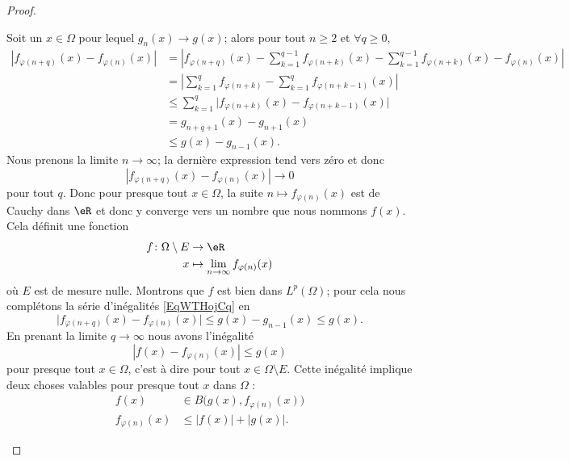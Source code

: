 \begin{proof}
\begin{subproof}
        Soit un \( x\in \Omega\) pour lequel \( g_n(x)\to g(x)\); alors pour tout \( n\geq 2\) et \( \forall q\geq 0\),
        \begin{subequations}    \label{EqWTHojCq}
            \begin{align}
                | f_{\varphi(n+q)}(x)-f_{\varphi(n)}(x) |&=\left| f_{\varphi(n+q)}(x)-\sum_{k=1}^{q-1}f_{\varphi(n+k)}(x) -\sum_{k=1}^{q-1}f_{\varphi(n+k)}(x)-f_{\varphi(n)}(x) \right| \\
                &=\left| \sum_{k=1}^qf_{\varphi(n+k)}-\sum_{k=1}^qf_{\varphi(n+k-1)}(x) \right|\\
                &\leq \sum_{k=1}^q\Big| f_{\varphi(n+k)}(x)-f_{\varphi(n+k-1)}(x) \Big|\\
                &=g_{n+q+1}(x)-g_{n+1}(x)\\
                &\leq g(x)-g_{n-1}(x).
            \end{align}
        \end{subequations}
        Nous prenons la limite \( n\to \infty\); la dernière expression tend vers zéro et donc
        \begin{equation}
            | f_{\varphi(n+q)}(x)-f_{\varphi(n)}(x) |\to 0
        \end{equation}
        pour tout \( q\). Donc pour presque tout \( x\in \Omega\), la suite \( n\mapsto f_{\varphi(n)}(x)\) est de Cauchy dans \( \eR\) et donc y converge vers un nombre que nous nommons \( f(x)\). Cela définit une fonction
        \begin{equation}
            \begin{aligned}
                f\colon \Omega\setminus E&\to \eR \\
                x&\mapsto \lim_{n\to \infty} f_{\varphi(n)}(x)
            \end{aligned}
        \end{equation}
        où \( E\) est de mesure nulle. Montrons que \( f\) est bien dans \( L^p(\Omega)\); pour cela nous complétons la série d'inégalités \eqref{EqWTHojCq} en
        \begin{equation}
            \big| f_{\varphi(n+q)}(x)-f_{\varphi(n)}(x) \big|\leq g(x)-g_{n-1}(x)\leq g(x).
        \end{equation}
        En prenant la limite \( q\to \infty\) nous avons l'inégalité
        \begin{equation}    \label{EqMQbDRac}
            | f(x)-f_{\varphi(n)}(x) |\leq g(x)
        \end{equation}
        pour presque tout \( x\in\Omega\), c'est à dire pour tout \( x\in\Omega\setminus E\). Cette inégalité implique deux choses valables pour presque tout \( x\) dans \( \Omega\) :
        \begin{subequations}
            \begin{align}
                f(x)&\in B\big( g(x),f_{\varphi(n)}(x) \big)\\
                f_{\varphi(n)}(x)&\leq | f(x) |+| g(x) |.
            \end{align}
        \end{subequations}


\end{subproof}
\end{proof}
